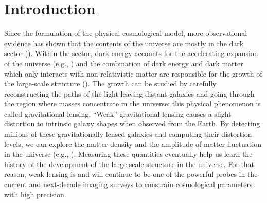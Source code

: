 {%


\section{Introduction}

Since the formulation of the physical cosmological model, more observational evidence has shown that the contents of the universe are mostly in the dark sector (\citealt{2020A&A...633A..69H, 2018PhRvD..98d3528T, 2019PhRvL.122q1301A, 2019PASJ...71...43H, 2021A&A...645A.104A}). Within the sector, dark energy accounts for the accelerating expansion of the universe (e.g., \citealt{1998AJ....116.1009R, 1999AIPC..478..129P}) and the combination of dark energy and dark matter which only interacts with non-relativistic matter are responsible for the growth of the large-scale structure (\citealt{2015RPPh...78h6901K, 2017grle.book.....D}). The growth can be studied by carefully reconstructing the paths of the light leaving distant galaxies and going through the region where masses concentrate in the universe; this physical phenomenon is called gravitational lensing. “Weak” gravitational lensing causes a slight distortion to intrinsic galaxy shapes when observed from the Earth. By detecting millions of these gravitationally lensed galaxies and computing their distortion levels, we can explore the matter density and the amplitude of matter fluctuation in the universe (e.g., \citealt{2001PhR...340..291B}). Measuring these quantities eventually help us learn the history of the development of the large-scale structure in the universe. For that reason, weak lensing is and will continue to be one of the powerful probes in the current and next-decade imaging surveys to constrain cosmological parameters with high precision. \par


}
